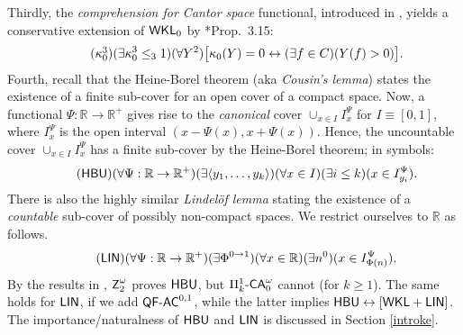 \documentclass[reqno]{amsart}
\newcommand\be{\begin{equation}}
\newcommand\ee{\end{equation}}
\def\SIXK{\Pi_{k}^{1}\text{-\textsf{\textup{CA}}}_{0}^{\omega}}
\def\Z{\textup{\textsf{Z}}}
\def\RCA{\textup{\textsf{RCA}}}
\def\RCAo{\textup{\textsf{RCA}}_{0}^{\omega}}
\def\WKL{\textup{\textsf{WKL}}}
\def\N{{\mathbb  N}}
\def\R{{\mathbb  R}}
\def\L{\textsf{\textup{L}}}
\def\MUC{\textup{\textsf{MUC}}}
\def\di{\rightarrow}
\def\asa{\leftrightarrow}
\def\QFAC{\textup{\textsf{QF-AC}}}
\def\HBU{\textup{\textsf{HBU}}}
\def\LIN{\textup{\textsf{LIN}}}
\numberwithin{equation}{section}
\numberwithin{thm}{section}
\begin{document}
\smallskip
\noindent
Thirdly, the \emph{comprehension for Cantor space} functional, introduced in \cite{dagsamV}, yields a conservative extension of $\WKL_{0}$ by \cite{kohlenbach2}*{Prop.\ 3.15}:
\be\tag{$\kappa_{0}^{3}$}
(\exists \kappa_{0}^{3}\leq_{3}1)(\forall Y^{2})\big[ \kappa_{0}(Y)=0\asa (\exists f\in C)(Y(f)>0)  \big].
\ee
\noindent
Fourth, recall that the Heine-Borel theorem (aka \emph{Cousin's lemma}) states the existence of a finite sub-cover for an open cover of a compact space. 
Now, a functional $\Psi:\R\di \R^{+}$ gives rise to the \emph{canonical} cover $\cup_{x\in I} I_{x}^{\Psi}$ for $I\equiv [0,1]$, where $I_{x}^{\Psi}$ is the open interval $(x-\Psi(x), x+\Psi(x))$.  
Hence, the uncountable cover $\cup_{x\in I} I_{x}^{\Psi}$ has a finite sub-cover by the Heine-Borel theorem; in symbols:
\be\tag{$\HBU$}
(\forall \Psi:\R\di \R^{+})(\exists \langle y_{1}, \dots, y_{k}\rangle){(\forall x\in I)}(\exists i\leq k)(x\in I_{y_{i}}^{\Psi}).
\ee
There is also the highly similar \emph{Lindel\"of lemma} stating the existence of a \emph{countable} sub-cover of possibly non-compact spaces.  We restrict ourselves to $\R$ as follows. 
\be\tag{$\LIN$}
(\forall \Psi:\R\di \R^{+})(\exists \Phi^{0\di 1})(\forall x\in \R)(\exists n^{0})(x\in I^{\Psi}_{\Phi(n)}),
\ee
By the results in \cite{dagsamIII, dagsamV}, $\Z_{2}^{\omega}$ proves $\HBU$, but $\SIXK$ cannot (for $k\geq 1$). The same holds for $\LIN$, if we add $\QFAC^{0,1}$, while the latter implies $\HBU\asa [\WKL+\LIN]$.
The importance/naturalness of $\HBU$ and $\LIN$ is discussed in Section \ref{introke}. 
\end{document}
